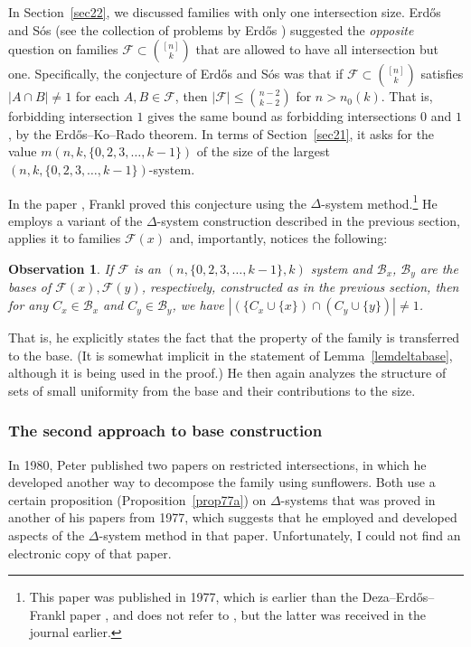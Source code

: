 \documentclass[graybox]{svmult}
\renewcommand{\le}{\leqslant}
\newcommand{\ff}{\mathcal{F}}
\newcommand{\m}{\mathcal}
\newtheorem{obs}[thm]{Observation}
\begin{document}
In Section~\ref{sec22}, we discussed families with only one intersection size. Erd\H os and S\'os (see the collection of problems by Erd\H os \cite[page 18]{Erd75}) suggested the {\it opposite} question on families $\ff\subset {[n]\choose k}$ that are allowed to have all intersection but one. Specifically, the conjecture of Erd\H os and S\'os was that if $\ff\subset {[n]\choose k}$ satisfies $|A\cap B|\ne 1$ for each $A,B\in \ff$, then $|\ff|\le {n-2\choose k-2}$ for $n>n_0(k)$. That is, forbidding intersection $1$ gives the same bound as forbidding intersections $0$ and $1$, by the Erd\H os--Ko--Rado theorem. In terms of Section~\ref{sec21}, it asks for the value $m(n,k,\{0,2,3,\ldots, k-1\})$ of the size of the largest $(n,k,\{0,2,3,\ldots, k-1\})$-system.


In the paper \cite{Fra1}, Frankl proved this conjecture using the $\Delta$-system method.\footnote{This paper was published in 1977, which is earlier than the Deza--Erd\H os--Frankl paper \cite{DEF}, and does not refer to \cite{DEF}, but the latter was received in the journal earlier.} He employs a variant of the $\Delta$-system construction described in the previous section, applies it to families $\ff(x)$ and, importantly, notices the following:
\begin{obs}
  If $\ff$ is an $(n, \{0,2,3,\ldots, k-1\},k)$ system and  $\m B_x$, $\m B_y$ are the bases of $\ff(x),\ff(y)$, respectively, constructed as in the previous section, then for any $C_x\in \m B_x$ and $C_y\in \m B_y$, we have $|(\{C_x\cup \{x\})\cap (C_y\cup \{y\})|\ne 1$.
\end{obs}
That is, he explicitly states the fact that the property of the family is transferred to the base. (It is somewhat implicit in the statement of Lemma~\ref{lemdeltabase}, although it is being used in the proof.) He then again analyzes the structure of sets of small uniformity from the base and their contributions to the size.

\subsubsection{The second approach to base construction}\label{sec241} In 1980, Peter published two papers on restricted intersections, in which he developed another way to decompose the family using sunflowers. Both use a certain proposition (Proposition~\ref{prop77a}) on $\Delta$-systems that was proved in another of his papers \cite{Fra77b} from 1977, which suggests that he employed and developed aspects of the $\Delta$-system method in that paper. Unfortunately, I could not find an electronic copy of that paper.
\end{document}
